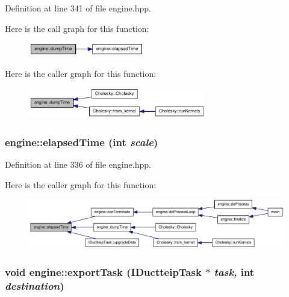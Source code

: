 Definition at line 341 of file engine.hpp.

Here is the call graph for this function:\nopagebreak
\begin{figure}[H]
\begin{center}
\leavevmode
\includegraphics[width=143pt]{classengine_aa53319327cf7350b84bb928214e3dae0_cgraph}
\end{center}
\end{figure}


Here is the caller graph for this function:\nopagebreak
\begin{figure}[H]
\begin{center}
\leavevmode
\includegraphics[width=220pt]{classengine_aa53319327cf7350b84bb928214e3dae0_icgraph}
\end{center}
\end{figure}
\hypertarget{classengine_a1b418ba0ce7d9614cd03a30ab119456a}{
\subsubsection[{elapsedTime}]{ engine::elapsedTime (int {\em scale})}}
\label{classengine_a1b418ba0ce7d9614cd03a30ab119456a}


Definition at line 336 of file engine.hpp.

Here is the caller graph for this function:\nopagebreak
\begin{figure}[H]
\begin{center}
\leavevmode
\includegraphics[width=352pt]{classengine_a1b418ba0ce7d9614cd03a30ab119456a_icgraph}
\end{center}
\end{figure}
\hypertarget{classengine_ab64370db1774805a8fbe041bdde1a01c}{
\subsubsection[{exportTask}]{\setlength{\rightskip}{0pt plus 5cm}void engine::exportTask ({\bf IDuctteipTask} $\ast$ {\em task}, \/  int {\em destination})}}
\label{classengine_ab64370db1774805a8fbe041bdde1a01c}


